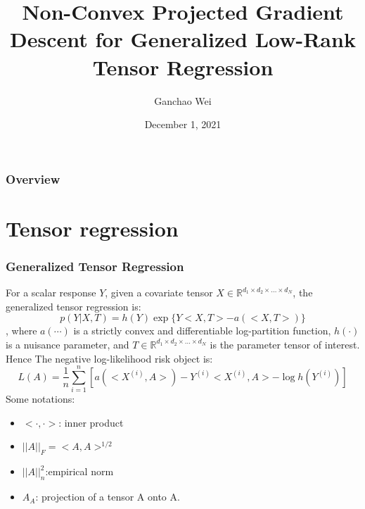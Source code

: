 \documentclass{beamer}
\title[PGD]{Non-Convex Projected Gradient Descent for Generalized Low-Rank Tensor Regression}
\author{Ganchao Wei}
\date{December 1, 2021}
\begin{document}
	
	\begin{frame}
		\titlepage %
	\end{frame}
	
	\begin{frame}
		\frametitle{Overview} %
		\tableofcontents
	\end{frame}
	
	
	\section{Tensor regression}
	
	\begin{frame}
		\frametitle{Generalized Tensor Regression}
		For a scalar response $Y$, given a covariate tensor $X\in\mathbb{R}^{d_1\times d_2\times \ldots \times d_N}$, the generalized tensor regression is:
		$$p(Y|X,T)=h(Y)\exp\{Y<X,T> - a(<X,T>)\}$$
		, where $a(\cdots)$ is a strictly convex and differentiable log-partition function, $h(\cdot)$ is a nuisance parameter, and $T\in\mathbb{R}^{d_1\times d_2\times \ldots \times d_N}$ is the parameter tensor of interest. Hence The negative log-likelihood risk object is:
		$$L(A) = \frac{1}{n}\sum_{i=1}^{n}[a(<X^{(i)}, A>) - Y^{(i)}<X^{(i)}, A> - \log h(Y^{(i)})]$$
		Some notations:
		\begin{itemize}
			\item 
			$<\cdot,\cdot>$: inner product
			\item
			$||A||_F = <A,A>^{1/2}$
			\item
			$||A||_n^2$:empirical norm
			\item
			$A_{A}$: projection of a tensor A onto A.
		\end{itemize}
	\end{frame}
	
\end{document}
